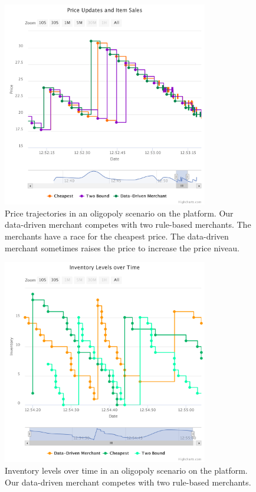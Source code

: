 \begin{figure}[t]
	\centering
	\includegraphics[width=0.8\textwidth]{figures/competition_prices.pdf}
	\caption[Price trajectories in oligopoly scenario]{Price trajectories in an oligopoly scenario on the \pricewars platform. Our data-driven merchant competes with two rule-based merchants. The merchants have a race for the cheapest price. The data-driven merchant sometimes raises the price to increase the price niveau.}
	\label{fig:competition_prices}
\end{figure}

\begin{figure}[t]
	\centering
	\includegraphics[width=0.8\textwidth]{figures/competition_inventory.pdf}
	\caption[Inventory levels in oligopoly scenario]{Inventory levels over time in an oligopoly scenario on the \pricewars platform. Our data-driven merchant competes with two rule-based merchants.}
	\label{fig:competition_inventory}
\end{figure}

